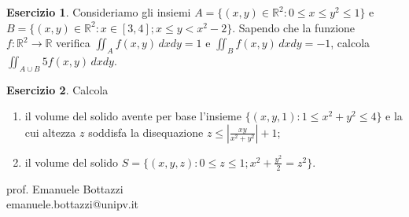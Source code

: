 \documentclass[12pt,a4paper]{article}
\theoremstyle{definition}
\newtheorem{exe}{Esercizio}
\begin{document}
\begin{exe}
    Consideriamo gli insiemi $A = \{(x,y) \in \mathbb{R}^2 : 0 \leq x \leq y^2 \leq 1\}$ e $B = \{(x,y) \in \mathbb{R}^2 : x \in [3,4]; x \leq y < x^2-2\}$. Sapendo che la funzione $f : \mathbb{R}^2 \to \mathbb{R}$ verifica $\iint_A f(x,y) \, dx dy = 1$ e $\iint_B f(x,y) \, dx dy = -1$, calcola $\iint_{A \cup B} 5f(x,y) \, dx dy$.
\end{exe}

\begin{exe}
    Calcola
    \begin{enumerate}
        \item il volume del solido avente per base l'insieme $\{(x,y,1) : 1 \leq x^2 + y^2 \leq 4\}$ e la cui altezza $z$ soddisfa la disequazione $z \leq \left| \frac{xy}{x^2+y^2} \right| + 1$;
        \item il volume del solido $S = \{(x,y,z) : 0 \leq z \leq 1; x^2 + \frac{y^2}{2} = z^2 \}$.
    \end{enumerate}
\end{exe}

\begin{center}
    prof. Emanuele Bottazzi\\
    emanuele.bottazzi@unipv.it
\end{center}
\end{document}

